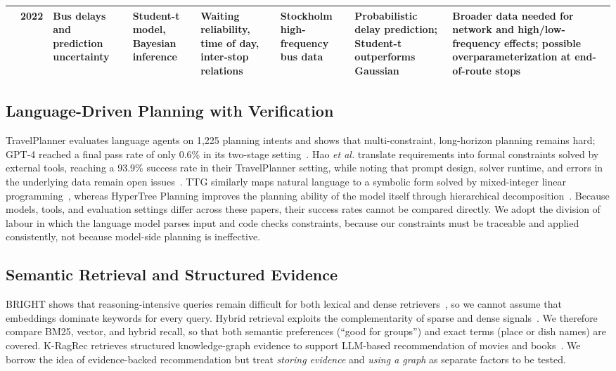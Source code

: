\documentclass[conference]{IEEEtran}
\begin{document}
\begin{table}[!t]
\begin{tabular}{@{}L{0.65cm}L{0.7cm}L{1.9cm}L{2.1cm}L{2.0cm}L{2.4cm}L{3.0cm}L{3.15cm}@{}}
\cite{bus_delay_uncertainty} & 2022 & Bus delays and prediction uncertainty & Student-t model, Bayesian inference & Waiting reliability, time of day, inter-stop relations & Stockholm high-frequency bus data & Probabilistic delay prediction; Student-t outperforms Gaussian & Broader data needed for network and high/low-frequency effects; possible overparameterization at end-of-route stops \\
\bottomrule
\end{tabular}
\end{table}

\subsection{Language-Driven Planning with Verification}
TravelPlanner evaluates language agents on 1{,}225 planning intents and shows that multi-constraint, long-horizon planning remains hard; GPT-4 reached a final pass rate of only 0.6\% in its two-stage setting~\cite{llm_planning}. Hao \emph{et al.} translate requirements into formal constraints solved by external tools, reaching a 93.9\% success rate in their TravelPlanner setting, while noting that prompt design, solver runtime, and errors in the underlying data remain open issues~\cite{llm_planning_tools}. TTG similarly maps natural language to a symbolic form solved by mixed-integer linear programming~\cite{ttg}, whereas HyperTree Planning improves the planning ability of the model itself through hierarchical decomposition~\cite{hypertree_planning}. Because models, tools, and evaluation settings differ across these papers, their success rates cannot be compared directly. We adopt the division of labour in which the language model parses input and code checks constraints, because our constraints must be traceable and applied consistently, not because model-side planning is ineffective.

\subsection{Semantic Retrieval and Structured Evidence}
BRIGHT shows that reasoning-intensive queries remain difficult for both lexical and dense retrievers~\cite{bright}, so we cannot assume that embeddings dominate keywords for every query. Hybrid retrieval exploits the complementarity of sparse and dense signals~\cite{hybrid_retrieval}. We therefore compare BM25, vector, and hybrid recall, so that both semantic preferences (``good for groups'') and exact terms (place or dish names) are covered. K-RagRec retrieves structured knowledge-graph evidence to support LLM-based recommendation of movies and books~\cite{knowledge_graph_llm_recommendation}. We borrow the idea of evidence-backed recommendation but treat \emph{storing evidence} and \emph{using a graph} as separate factors to be tested.
\end{document}
